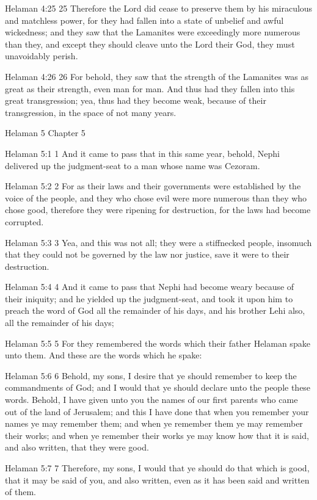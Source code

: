 Helaman 4:25
 25 Therefore the Lord did cease to preserve them by his
miraculous and matchless power, for they had fallen into a state
of unbelief and awful wickedness; and they saw that the Lamanites
were exceedingly more numerous than they, and except they should
cleave unto the Lord their God, they must unavoidably perish.

Helaman 4:26
 26 For behold, they saw that the strength of the Lamanites was
as great as their strength, even man for man. And thus had they
fallen into this great transgression; yea, thus had they become
weak, because of their transgression, in the space of not many
years.

Helaman 5
Chapter 5

Helaman 5:1
 1 And it came to pass that in this same year, behold, Nephi
delivered up the judgment-seat to a man whose name was Cezoram.

Helaman 5:2
 2 For as their laws and their governments were established by
the voice of the people, and they who chose evil were more
numerous than they who chose good, therefore they were ripening
for destruction, for the laws had become corrupted.

Helaman 5:3
 3 Yea, and this was not all; they were a stiffnecked people,
insomuch that they could not be governed by the law nor justice,
save it were to their destruction.

Helaman 5:4
 4 And it came to pass that Nephi had become weary because of
their iniquity; and he yielded up the judgment-seat, and took it
upon him to preach the word of God all the remainder of his days,
and his brother Lehi also, all the remainder of his days;

Helaman 5:5
 5 For they remembered the words which their father Helaman spake
unto them. And these are the words which he spake:

Helaman 5:6
 6 Behold, my sons, I desire that ye should remember to keep the
commandments of God; and I would that ye should declare unto the
people these words. Behold, I have given unto you the names of
our first parents who came out of the land of Jerusalem; and this
I have done that when you remember your names ye may remember
them; and when ye remember them ye may remember their works; and
when ye remember their works ye may know how that it is said, and
also written, that they were good.

Helaman 5:7
 7 Therefore, my sons, I would that ye should do that which is
good, that it may be said of you, and also written, even as it
has been said and written of them.

